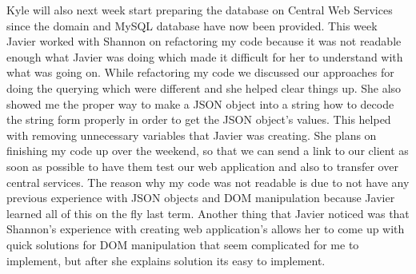 \documentclass[letterpaper,10pt,serif,draftclsnofoot,onecolumn,compsoc,titlepage]{IEEEtran}
\begin{document}
 Kyle will also next week start preparing the database on Central Web Services since the domain and MySQL
 database have now been provided.
 This week Javier worked with Shannon on refactoring my code because it was not readable enough what Javier was
 doing which made it difficult for her to understand with what was going on. While refactoring my code we
 discussed our approaches for doing the querying which were different and she helped clear things up.
 She also showed me the proper way to make a JSON object into a string how to decode the string form
 properly in order to get the JSON object's values. This helped with removing unnecessary variables that Javier
 was creating. She plans on finishing my code up over the weekend, so that we can send a link to our client
 as soon as possible to have them test our web application and also to transfer over central services. The reason
 why my code was not readable is due to not have any previous experience with JSON objects and DOM manipulation
 because Javier learned all of this on the fly last term. Another thing that Javier noticed was that Shannon's 
 experience with creating web application's allows her to come up with quick solutions for DOM manipulation that
 seem complicated for me to implement, but after she explains solution its easy to implement.
\end{document}

